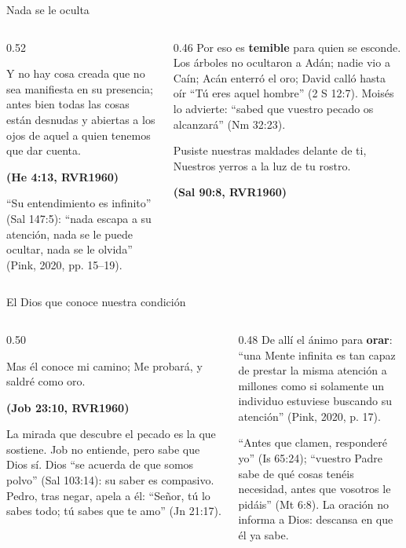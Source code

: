 \documentclass[hyperref={bookmarks=false},aspectratio=169]{beamer}
\newcommand{\fuente}[1]{\par\hfill{\upshape\bfseries\footnotesize\textcolor{azul}{#1}}}
\newcommand{\destacar}[1]{\textbf{\textcolor{azul}{#1}}}
\begin{document}
\begin{frame}{Nada se le oculta}
\begin{columns}[t,onlytextwidth]
\begin{column}{0.52\textwidth}
\begin{cita}[fontupper=\scriptsize\itshape]Y no hay cosa creada que no sea manifiesta en su presencia; antes bien todas las cosas están desnudas y abiertas a los ojos de aquel a quien tenemos que dar cuenta.\fuente{(He 4:13, RVR1960)}\end{cita}
\scriptsize ``Su entendimiento es infinito'' (Sal 147:5): ``nada escapa a su atención, nada se le puede ocultar, nada se le olvida'' (Pink, 2020, pp. 15--19).
\end{column}
\begin{column}{0.46\textwidth}\scriptsize
Por eso es \destacar{temible} para quien se esconde. Los árboles no ocultaron a Adán; nadie vio a Caín; Acán enterró el oro; David calló hasta oír ``Tú eres aquel hombre'' (2 S 12:7). Moisés lo advierte: ``sabed que vuestro pecado os alcanzará'' (Nm 32:23).
\begin{cita}[fontupper=\scriptsize\itshape]Pusiste nuestras maldades delante de ti, Nuestros yerros a la luz de tu rostro.\fuente{(Sal 90:8, RVR1960)}\end{cita}
\end{column}
\end{columns}
\end{frame}

\begin{frame}{El Dios que conoce nuestra condición}
\begin{columns}[t,onlytextwidth]
\begin{column}{0.50\textwidth}
\begin{cita}[fontupper=\scriptsize\itshape]Mas él conoce mi camino; Me probará, y saldré como oro.\fuente{(Job 23:10, RVR1960)}\end{cita}
\scriptsize La mirada que descubre el pecado es la que sostiene. Job no entiende, pero sabe que Dios sí. Dios ``se acuerda de que somos polvo'' (Sal 103:14): su saber es compasivo. Pedro, tras negar, apela a él: ``Señor, tú lo sabes todo; tú sabes que te amo'' (Jn 21:17).
\end{column}
\begin{column}{0.48\textwidth}\scriptsize
De allí el ánimo para \destacar{orar}: ``una Mente infinita es tan capaz de prestar la misma atención a millones como si solamente un individuo estuviese buscando su atención'' (Pink, 2020, p. 17).\par\medskip
``Antes que clamen, responderé yo'' (Is 65:24); ``vuestro Padre sabe de qué cosas tenéis necesidad, antes que vosotros le pidáis'' (Mt 6:8). La oración no informa a Dios: descansa en que él ya sabe.
\end{column}
\end{columns}
\end{frame}
\end{document}
